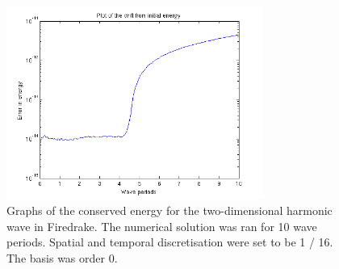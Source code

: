 \documentclass[a4paper,11pt]{article}
\begin{document}
\begin{figure}
    \centering
    \includegraphics[width=0.75\textwidth]{error2dfd.png}
       \caption{Graphs of the conserved energy for the two-dimensional harmonic wave in Firedrake. The numerical solution was ran for 10 wave periods. Spatial and temporal  discretisation were set to be 1 / 16. The basis was order 0.}
        \label{test}
\end{figure}
\end{document}
